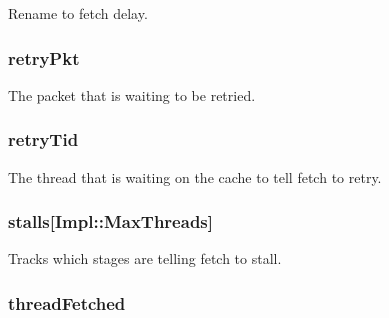 \label{classDefaultFetch_ae97f1fdea38bf1719a7d45a15f3dcd5c}
Rename to fetch delay. \hypertarget{classDefaultFetch_a314ae93c04b3ca96e79e1b1f39a8e478}{
\subsubsection[{retryPkt}]{ {\bf retryPkt}}}
\label{classDefaultFetch_a314ae93c04b3ca96e79e1b1f39a8e478}
The packet that is waiting to be retried. \hypertarget{classDefaultFetch_a865aaad70625f17392c717930860d386}{
\subsubsection[{retryTid}]{ {\bf retryTid}}}
\label{classDefaultFetch_a865aaad70625f17392c717930860d386}
The thread that is waiting on the cache to tell fetch to retry. \hypertarget{classDefaultFetch_ade48cf321f5741ea8e54e071680cacdc}{
\subsubsection[{stalls}]{ {\bf stalls}\mbox{[}Impl::MaxThreads\mbox{]}}}
\label{classDefaultFetch_ade48cf321f5741ea8e54e071680cacdc}
Tracks which stages are telling fetch to stall. \hypertarget{classDefaultFetch_ac4dd16b14420d21b5704350fbbcefd04}{
\subsubsection[{threadFetched}]{ {\bf threadFetched}}}
\label{classDefaultFetch_ac4dd16b14420d21b5704350fbbcefd04}
